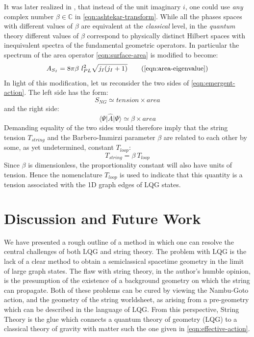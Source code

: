 \documentclass{ws-mpla}
\newcommand{\mbb}[1]{\mathbb{#1}}
\newcommand{\expect}[1]{\langle #1\rangle}
\begin{document}
It was later realized in \cite{Barbero1996From,Immirzi1996Real}, that instead of the unit imaginary $ i $, one could use \emph{any} complex number $ \beta \in \mbb{C}$ in \eqref{eqn:ashtekar-transform}. While all the phases spaces with different values of $ \beta $ are equivalent at the \emph{classical} level, in the \emph{quantum} theory different values of $ \beta $ correspond to physically distinct Hilbert spaces with inequivalent spectra of the fundamental geometric operators. In particular the spectrum of the area operator \eqref{eqn:surface-area} is modified to become:
\begin{equation}\label{eqn:surface-area-immirizi}
	A_{S_I} = 8\pi \beta ~ l^2_{PL} \sqrt{j_I (j_I + 1)} \tag{\ref{eqn:area-eigenvalue}}
\end{equation}
In light of this modification, let us reconsider the two sides of \eqref{eqn:emergent-action}. The left side has the form:
\begin{equation*}
	S_{NG} \simeq tension \times area
\end{equation*}
and the right side:
\begin{equation*}
	\expect{\Psi\vert \hat A \vert \Psi} \simeq \beta \times area
\end{equation*}
Demanding equality of the two sides would therefore imply that the string tension $ T_{string} $ and the Barbero-Immirzi parameter $ \beta $ are related to each other by some, as yet undetermined, constant $ T_{loop} $:
\begin{equation}\label{key}
	T_{string} = \beta ~ T_{loop}
\end{equation}
Since $ \beta $ is dimensionless, the proportionality constant will also have units of tension. Hence the nomenclature $ T_{loop} $ is used to indicate that this quantity is a tension associated with the 1D graph edges of LQG states.

\section{Discussion and Future Work}\label{sec:discussion}

We have presented a rough outline of a method in which one can resolve the central challenges of both LQG and string theory. The problem with LQG is the lack of a clear method to obtain a semiclassical spacetime geometry in the limit of large graph states. The flaw with string theory, in the author's humble opinion, is the presumption of the existence of a background geometry on which the string can propagate. Both of these problems can be cured by viewing the Nambu-Goto action, and the geometry of the string worldsheet, as arising from a pre-geometry which can be described in the language of LQG. From this perspective, String Theory is the glue which connects a quantum theory of geometry (LQG) to a classical theory of gravity with matter such the one given in \eqref{eqn:effective-action}.
\end{document}
